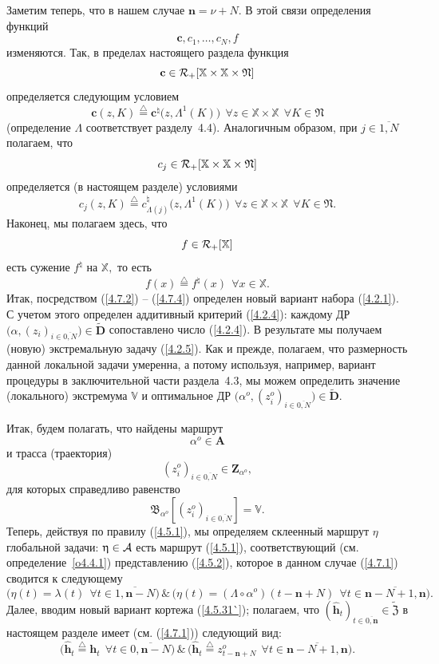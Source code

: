 \documentclass[11pt,twoside,openany]{report}
\newcommand{\bfn}{\begin{equation}}
\newcommand{\efn}{\end{equation}}
\newcommand{\df}{\stackrel{\triangle}{=}}
\newcommand{\ov}{\overline}
\newcommand{\La}{\Lambda}
\newcommand{\la}{\lambda}
\newcommand{\al}{\alpha}
\newcommand{\fa}{\forall}
\newcommand{\car}{{\cal R}}
\newcommand{\ca}{{\cal A}}
\newcommand{\bbx}{{\mathbb X}}
\newcommand{\bbv}{{\mathbb V}}
\newcommand{\nn}{{\mathbf n}}
\begin{document}
{{Заметим теперь, что в нашем случае $\nn=\nu+N.$ В этой связи определения функций
$$\mathbf{c},c_1,\ldots,c_N,f
$$
изменяются. Так, в пределах настоящего раздела функция
$$\mathbf{c}\in \car_+[\bbx \times \bbx\times \mathfrak{N}]
$$
определяется следующим условием
\bfn\label{4.7.2}\mathbf{c}(z,K) \df \mathbf{c}^\natural\bigl(z,\La^1(K)\bigl)\ \
\fa z\in \bbx\times \bbx\ \ \fa K\in \mathfrak{N}
\efn
(определение $\La$ соответствует разделу~4.4). Аналогичным образом, при $j\in\ov{1,N}$
полагаем, что $$c_j \in \car_+[\bbx\times \bbx\times \mathfrak{N}]
$$
определяется (в настоящем разделе) условиями
\bfn\label{4.7.3}c_j(z,K) \df c_{\La(j)}^\natural\bigl(z,\La^1(K)\bigl)\ \ \fa z\in
\bbx\times \bbx\ \ \fa K\in \mathfrak{N}.
\efn
Наконец, мы полагаем здесь, что
$$f\in \car_+[\bbx]
$$
есть сужение $f^\natural$ на $\bbx,$ то есть
\bfn\label{4.7.4}f(x) \df f^\natural(x)\ \ \fa x\in \bbx.
\efn
Итак, посредством (\ref{4.7.2}) -- (\ref{4.7.4}) определен новый вариант набора (\ref{4.2.1}).
С учетом этого определен аддитивный критерий (\ref{4.2.4}): каждому ДР
$\bigl(\al,(z_i)_{i\in\ov{0,N}}\bigl)\in \widetilde{\mathbf{D}}$ сопоставлено число
(\ref{4.2.4}). В результате мы получаем (новую) экстремальную задачу (\ref{4.2.5}).
Как и прежде, полагаем, что размерность данной локальной задачи умеренна, а потому
используя, например,  вариант процедуры в заключительной части раздела~4.3, мы можем
определить значение (локального) экстремума $\bbv$ и оптимальное ДР
$\bigl(\al^o,(z_i^o)_{i\in\ov{0,N}}\bigl)\in \widetilde{\mathbf{D}}.$

Итак, будем полагать, что найдены маршрут
\bfn\label{4.7.5}\al^o\in \mathbf{A}
\efn
и трасса (траектория)
\bfn\label{4.7.6}(z_i^o)_{i\in\ov{0,N}}\in \mathbf{Z}_{\al^o},
\efn
для которых справедливо равенство
\bfn\label{4.7.7}\mathfrak{B}_{\al^o}[(z_i^o)_{i\in\ov{0,N}}]= \bbv.
\efn
Теперь, действуя по правилу (\ref{4.5.1}), мы определяем склеенный маршрут $\eta$
глобальной задачи: $\eta\in\ca$ есть маршрут (\ref{4.5.1}), соответствующий (см.
определение~\ref{o4.4.1}) представлению (\ref{4.5.2}), которое в данном случае
(\ref{4.7.1}) сводится к следующему
\bfn\label{4.7.8}\bigl(\eta(t) = \la(t)\ \ \fa t\in\ov{1,\nn-N}\bigl)\,\&\,\bigl(\eta(t) =
(\La \circ \al^o)(t-\nn+N)\ \ \fa t\in \ov{\nn-N+1,\nn}\bigl).
\efn
Далее, вводим новый вариант кортежа (\ref{4.5.31`}); полагаем, что
$(\hat{\mathbf{h}}_t)_{t\in\ov{0,\nn}}\in \widetilde{\mathfrak{Z}}$ в настоящем разделе
имеет (см. (\ref{4.7.1})) следующий вид:
\bfn\label{4.7.9}\bigl(\hat{\mathbf{h}}_t \df \mathbf{h}_t\ \ \fa t\in\ov{0,\nn-N}\bigl)\,
\&\,\bigl(\hat{\mathbf{h}}_t \df z_{t-\nn+N}^o\ \ \fa t\in\ov{\nn-N+1,\nn}\bigl).
\efn

}}
\end{document}
